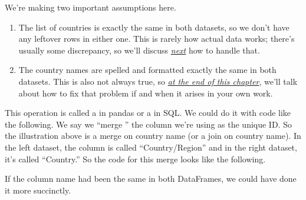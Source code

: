 \documentclass[letterpaper,10pt,english]{jupyterBook}
\begin{document}
\sphinxAtStartPar
We’re making two important assumptions here.
\begin{enumerate}
%
\item {} 
\sphinxAtStartPar
The list of countries is exactly the same in both datasets, so we don’t have any leftover rows in either one.  This is rarely how actual data works; there’s usually some discrepancy, so we’ll discuss {\hyperref[\detokenize{chapter-12-concat-and-merge:when-there-is-no-match-for-some-rows}]{\emph{next}}} how to handle that.

\item {} 
\sphinxAtStartPar
The country names are spelled and formatted exactly the same in both datasets.  This is also not always true, so {\hyperref[\detokenize{chapter-12-concat-and-merge:ensuring-a-unique-id-appears-in-both-datasets}]{\emph{at the end of this chapter}}}, we’ll talk about how to fix that problem if and when it arises in your own work.

\end{enumerate}

\sphinxAtStartPar
This operation is called a  in pandas or a  in SQL.  We could do it with code like the following.  We say we “merge ” the column we’re using as the unique ID.  So the illustration above is a merge on country name (or a join on country name).  In the left dataset, the column is called “Country/Region” and in the right dataset, it’s called “Country.”  So the code for this merge looks like the following.

\begin{sphinxVerbatim}[commandchars=\\\{\}]
    
      
\end{sphinxVerbatim}

\sphinxAtStartPar
If the column name had been the same in both DataFrames, we could have done it more succinctly.

\begin{sphinxVerbatim}[commandchars=\\\{\}]
      
\end{sphinxVerbatim}
\end{document}
